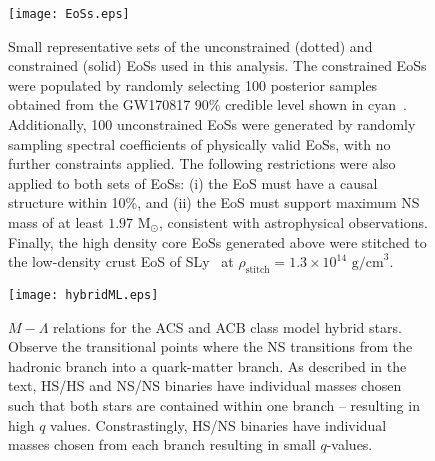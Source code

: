 \documentclass[prd,twocolumn,nofootinbib,superscriptaddress,amsmath,amssymb]{revtex4-1}
\begin{document}
\begin{figure}
\begin{center} 
\texttt{[image: EoSs.eps]}
\end{center}
\caption{
Small representative sets of the unconstrained (dotted) and constrained (solid) EoSs used in this analysis. 
The constrained EoSs were populated by randomly selecting 100 posterior samples obtained from the GW170817 90\% credible level shown in cyan~\cite{LIGO:posterior}.
Additionally, 100 unconstrained EoSs were generated by randomly sampling spectral coefficients of physically valid EoSs, with no further constraints applied.
The following restrictions were also applied to both sets of EoSs: (i) the EoS must have a causal structure within 10\%, and (ii) the EoS must support maximum NS mass of at least $1.97 \text{ M}_{\odot}$, consistent with astrophysical observations.
Finally, the high density core EoSs generated above were stitched to the low-density crust EoS of SLy~\cite{Douchin:2001sv} at $\rho_{\text{stitch}}=1.3 \times 10^{14} \text{ g/cm}^3$.}
\label{fig:eos}
\end{figure} 

\begin{figure}
\begin{center} 
\texttt{[image: hybridML.eps]}
\end{center}
\caption{
$M-\Lambda$ relations for the ACS and ACB class model hybrid stars. 
Observe the transitional points where the NS transitions from the hadronic branch into a quark-matter branch.
As described in the text, HS/HS and NS/NS binaries have individual masses chosen such that both stars are contained within one branch -- resulting in high $q$ values.
Constrastingly, HS/NS binaries have individual masses chosen from each branch resulting in small $q$-values.
}
\label{fig:hybridML}
\end{figure} 
\end{document}
